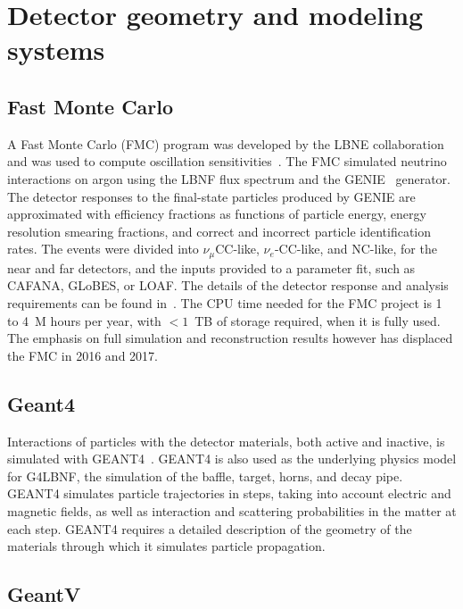 \section{Detector geometry and modeling systems}


\subsection{Fast Monte Carlo}

A Fast Monte Carlo (FMC) program was developed by the LBNE collaboration and was used to
compute oscillation sensitivities~\cite{cdr-vol-2}.  The FMC simulated neutrino interactions
on argon using the LBNF flux spectrum and the GENIE~\cite{GENIE} generator.  The detector
responses to the final-state particles produced by GENIE are approximated with efficiency
fractions as functions of particle energy, energy resolution smearing fractions, and
correct and incorrect particle identification rates.  The events were divided into
$\nu_\mu$CC-like, $\nu_e$-CC-like, and NC-like, for the near and far detectors, and the
inputs provided to a parameter fit, such as CAFANA, GLoBES, or LOAF.  The details of the
detector response and analysis requirements can be found in~\cite{cdr-vol-2}.  The CPU time needed
for the FMC project is 1 to 4~M hours per year, with $<1$~TB of storage required, when
it is fully used.  The emphasis on full simulation and reconstruction results however has
displaced the FMC in 2016 and 2017. 

\subsection{Geant4}

Interactions of particles with the detector materials, both active and inactive, is simulated with 
GEANT4~\cite{GEANT4:NIM}.  GEANT4 is also used as the underlying physics model for G4LBNF, the
simulation of the baffle, target, horns, and decay pipe.  GEANT4 simulates particle trajectories in steps,
taking into account electric and magnetic fields, as well as interaction and scattering probabilities in the
matter at each step.  GEANT4 requires a detailed description of the geometry of the materials through which
it simulates particle propagation.

\subsection{GeantV}

